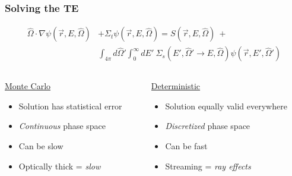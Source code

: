 \documentclass[xcolor=x11names,compress,handout]{beamer}
\renewcommand{\(}{\begin{columns}}
\renewcommand{\)}{\end{columns}}
\newcommand{\<}[1]{\begin{column}{#1}}
\renewcommand{\>}{\end{column}}
\newcommand{\vOmega}{\ensuremath{\hat{\Omega}}}
\begin{document}
\begin{frame}[fragile]
  \frametitle{Solving the TE}
  \begin{align}
\vOmega \cdot \nabla \psi(\vec{r}, E, \vOmega) &+
\Sigma_t \psi(\vec{r}, E, \vOmega) = S(\vec{r}, E, \vOmega) \:+\nonumber\\
%
& \int_{4\pi} d\vOmega' \int_0^{\infty} dE'\: \Sigma_s(E', \vOmega' \rightarrow E, \vOmega) \psi(\vec{r}, E', \vOmega') \nonumber
\end{align}
%
\begin{columns}
  \begin{column}{0.5\textwidth}
  \begin{center}
  \underline{Monte Carlo}
  \end{center}
  \vspace*{-1em}
	\begin{itemize}
	\item Solution has statistical error
	\item \textit{Continuous} phase space%
	\item Can be slow
	\item Optically thick = \textit{slow}
	\end{itemize}
  \end{column}
  \begin{column}{0.5\textwidth}
  \begin{center}
  \underline{Deterministic}
  \end{center}
  \vspace*{-1em}
	\begin{itemize}
	\item Solution equally valid everywhere
	\item \textit{Discretized} phase space%
	\item Can be fast
	\item Streaming = \textit{ray effects}
	\end{itemize}
  \end{column}
\end{columns}

\end{frame}
\end{document}
